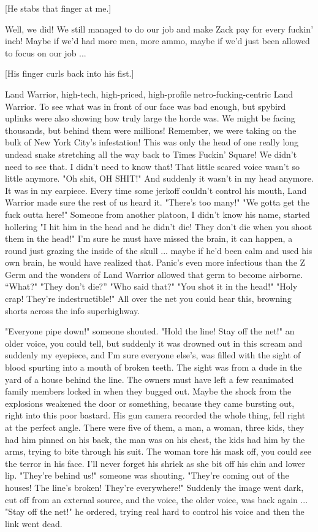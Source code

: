 \documentclass[10pt,a5paper,twoside]{book}
\begin{document}
[He stabs that finger at me.]

Well, we did! We still managed to do our job and make Zack pay for every fuckin' inch! Maybe if we'd had more men, more ammo, maybe if we'd just been allowed to focus on our job ...

[His finger curls back into his fist.]

Land Warrior, high-tech, high-priced, high-profile netro-fucking-centric Land Warrior. To see what was in front of our face was bad enough, but spybird uplinks were also showing how truly large the horde was. We might be facing thousands, but behind them were millions! Remember, we were taking on the bulk of New York City's infestation! This was only the head of one really long undead snake stretching all the way back to Times Fuckin' Square! We didn't need to see that. I didn't need to know that! That little scared voice wasn't so little anymore. "Oh shit, OH SHIT!" And suddenly it wasn’t in my head anymore. It was in my earpiece. Every time some jerkoff couldn't control his mouth, Land Warrior made sure the rest of us heard it. "There's too many!" "We gotta get the fuck outta here!" Someone from another platoon, I didn't know his name, started hollering "I hit him in the head and he didn't die! They don't die when you shoot them in the head!" I'm sure he must have missed the brain, it can happen, a round just grazing the inside of the skull ... maybe if he'd been calm and used his own brain, he would have realized that. Panic's even more infectious than the Z Germ and the wonders of Land Warrior allowed that germ to become airborne. “What?" "They don't die?” "Who said that?" "You shot it in the head!" "Holy crap! They're indestructible!" All over the net you could hear this, browning shorts across the info superhighway.

"Everyone pipe down!" someone shouted. "Hold the line! Stay off the net!" an older voice, you could tell, but suddenly it was drowned out in this scream and suddenly my eyepiece, and I'm sure everyone else's, was filled with the sight of blood spurting into a mouth of broken teeth. The sight was from a dude in the yard of a house behind the line. The owners must have left a few reanimated family members locked in when they bugged out. Maybe the shock from the explosions weakened the door or something, because they came bursting out, right into this poor bastard. His gun camera recorded the whole thing, fell right at the perfect angle. There were five of them, a man, a woman, three kids, they had him pinned on his back, the man was on his chest, the kids had him by the arms, trying to bite through his suit. The woman tore his mask off, you could see the terror in his face. I'll never forget his shriek as she bit off his chin and lower lip. "They're behind us!" someone was shouting. "They're coming out of the houses! The line's broken! They're everywhere!" Suddenly the image went dark, cut off from an external source, and the voice, the older voice, was back again ... "Stay off the net!" he ordered, trying real hard to control his voice and then the link went dead.
\end{document}
